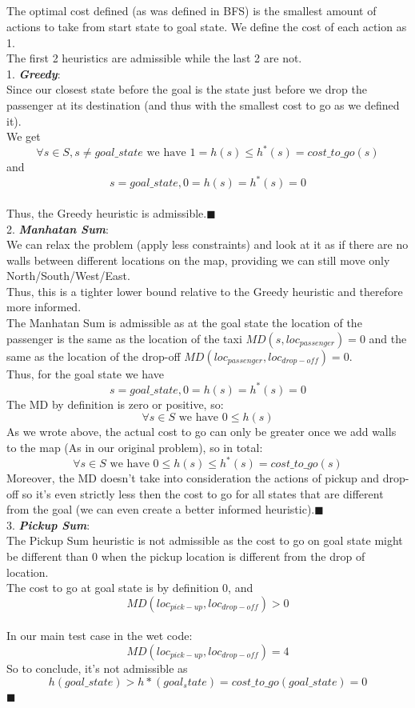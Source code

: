 \documentclass[12pt]{article}
\newcommand{\qed}{\hfill$\blacksquare$}
\begin{document}
\subsection{}

The optimal cost defined (as was defined in BFS) is the smallest amount of actions to take from start state to goal state. We define the cost of each action as 1.\\
The first 2 heuristics are admissible while the last 2 are not.\\

1. {\textit{\textbf{Greedy}}}:\\
Since our closest state before the goal is the state just before we drop the passenger at its destination (and thus with the smallest cost to go as we defined it).\\
We get $$\forall s\in S, s \neq goal\_state \text{ we have } 1 = h(s) \leq h^*(s) = cost\_to\_go(s)$$ and $$s=goal\_state, 0=h(s)=h^*(s) = 0$$\\
Thus, the Greedy heuristic is admissible.\qed\\

2. {\textit{\textbf{Manhatan Sum}}}:\\
We can relax the problem (apply less constraints) and look at it as if there are no walls between different locations on the map, providing we can still move only North/South/West/East.\\
Thus, this is a tighter lower bound relative to the Greedy heuristic and therefore more informed.\\
The Manhatan Sum is admissible as at the goal state the location of the passenger is the same as the location of the taxi $MD(s,loc_{passenger}) = 0$ and the same as the location of the drop-off $MD(loc_{passenger},loc_{drop-off}) = 0$.\\
Thus, for the goal state we have 
$$s=goal\_state, 0=h(s)=h^*(s) = 0$$
The MD by definition is zero or positive, so:
$$\forall s\in S \text{ we have } 0 \leq h(s) $$
As we wrote above, the actual cost to go can only be greater once we add walls to the map (As in our original problem), so in total:
$$\forall s\in S \text{ we have } 0 \leq h(s) \leq h^*(s) = cost\_to\_go(s)$$
Moreover, the MD doesn't take into consideration the actions of pickup and drop-off so it's even strictly less then the cost to go for all states that are different from the goal (we can even create a better informed heuristic).\qed\\

3. {\textit{\textbf{Pickup Sum}}}:\\
The Pickup Sum heuristic is not admissible as the cost to go on goal state might be different than 0 when the pickup location is different from the drop of location.\\
The cost to go at goal state is by definition 0, and $$MD(loc_{pick-up},loc_{drop-off}) > 0$$\\
In our main test case in the wet code:
$$MD(loc_{pick-up},loc_{drop-off})=4$$
So to conclude, it's not admissible as $$h(goal\_state) > h*(goal_state) = cost\_to\_go(goal\_state) = 0$$
\qed\\
\end{document}
